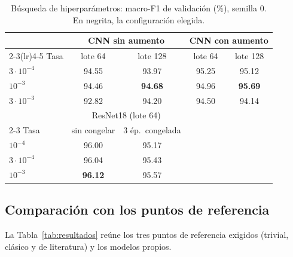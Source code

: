 \documentclass[conference]{IEEEtran}
\begin{document}
\begin{table}[!t]
\centering
\caption{Búsqueda de hiperparámetros: macro-F1 de validación (\%), semilla 0.
En negrita, la configuración elegida.}
\label{tab:busqueda}
\footnotesize
\setlength{\tabcolsep}{4pt}
\begin{tabular}{lcccc}
\toprule
 & \multicolumn{2}{c}{CNN sin aumento} & \multicolumn{2}{c}{CNN con aumento} \\
\cmidrule(lr){2-3}\cmidrule(lr){4-5}
Tasa & lote 64 & lote 128 & lote 64 & lote 128 \\
\midrule
$3\cdot10^{-4}$ & 94.55 & 93.97 & 95.25 & 95.12 \\
$10^{-3}$       & 94.46 & \textbf{94.68} & 94.96 & \textbf{95.69} \\
$3\cdot10^{-3}$ & 92.82 & 94.20 & 94.50 & 94.14 \\
\midrule
 & \multicolumn{2}{c}{ResNet18 (lote 64)} & & \\
\cmidrule(lr){2-3}
Tasa & sin congelar & 3 ép.\ congelada & & \\
\midrule
$10^{-4}$       & 96.00 & 95.17 & & \\
$3\cdot10^{-4}$ & 96.04 & 95.43 & & \\
$10^{-3}$       & \textbf{96.12} & 95.57 & & \\
\bottomrule
\end{tabular}
\end{table}

\subsection{Comparación con los puntos de referencia}
La Tabla~\ref{tab:resultados} reúne los tres puntos de referencia exigidos
(trivial, clásico y de literatura) y los modelos propios.
\end{document}
